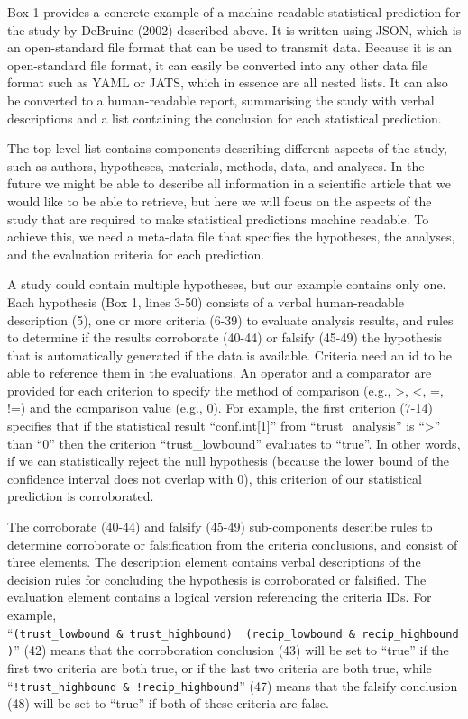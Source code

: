 \documentclass[doc,floatsintext]{apa6}
\begin{document}
Box 1 provides a concrete example of a machine-readable statistical prediction for the study by DeBruine (2002) described above. It is written using JSON, which is an open-standard file format that can be used to transmit data. Because it is an open-standard file format, it can easily be converted into any other data file format such as YAML or JATS, which in essence are all nested lists. It can also be converted to a human-readable report, summarising the study with verbal descriptions and a list containing the conclusion for each statistical prediction.

The top level list contains components describing different aspects of the study, such as authors, hypotheses, materials, methods, data, and analyses. In the future we might be able to describe all information in a scientific article that we would like to be able to retrieve, but here we will focus on the aspects of the study that are required to make statistical predictions machine readable. To achieve this, we need a meta-data file that specifies the hypotheses, the analyses, and the evaluation criteria for each prediction.

A study could contain multiple hypotheses, but our example contains only one. Each hypothesis (Box 1, lines 3-50) consists of a verbal human-readable description (5), one or more criteria (6-39) to evaluate analysis results, and rules to determine if the results corroborate (40-44) or falsify (45-49) the hypothesis that is automatically generated if the data is available. Criteria need an id to be able to reference them in the evaluations. An operator and a comparator are provided for each criterion to specify the method of comparison (e.g., \textgreater, \textless, =, !=) and the comparison value (e.g., 0). For example, the first criterion (7-14) specifies that if the statistical result \enquote{conf.int{[}1{]}} from \enquote{trust\_analysis} is \enquote{\textgreater{}} than \enquote{0} then the criterion \enquote{trust\_lowbound} evaluates to \enquote{true}. In other words, if we can statistically reject the null hypothesis (because the lower bound of the confidence interval does not overlap with 0), this criterion of our statistical prediction is corroborated.

The corroborate (40-44) and falsify (45-49) sub-components describe rules to determine corroborate or falsification from the criteria conclusions, and consist of three elements. The description element contains verbal descriptions of the decision rules for concluding the hypothesis is corroborated or falsified. The evaluation element contains a logical version referencing the criteria IDs. For example, \enquote{\texttt{(trust\_lowbound\ \&\ trust\_highbound)\ \textbar{}\ (recip\_lowbound\ \&\ recip\_highbound)}} (42) means that the corroboration conclusion (43) will be set to \enquote{true} if the first two criteria are both true, or if the last two criteria are both true, while \enquote{\texttt{!trust\_highbound\ \&\ !recip\_highbound}} (47) means that the falsify conclusion (48) will be set to \enquote{true} if both of these criteria are false.
\end{document}
